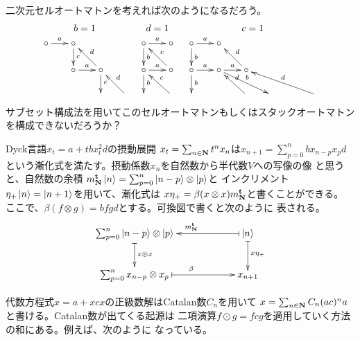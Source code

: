 {\begin{description}
		二次元セルオートマトンを考えれば次のようになるだろう。
		\begin{equation*}\begin{array}{ccc}
			b = 1 & d = 1 & c = 1 \\
			\xymatrix@R=4ex@C=4ex{
				\circ \ar[r]^a & \circ \ar[d]^c \\
				& \circ \ar[r]^a & \circ \ar[d]^c\ar[ul]_d \\
				& & & \ar[ul]_d \\
			} & \xymatrix@R=4ex@C=4ex{
				\circ \ar[d]^b \ar[r]^a & \circ \\
				\circ \ar[r]^a \ar[d]^b & \circ \ar[ul]_c \\
				& \ar[ul]_c \\
			} & \xymatrix@R=4ex@C=4ex{
				\circ \ar[d]^b \ar[r]^a & \circ \\
				\circ \ar[r]^a \ar[d]^b & \circ \ar[r]^a \ar[drr]^b 
					& \circ \ar[ul]_d \\
				& & \ar[ul]_d & & & \ar[ulll]_d \\
			}
		\end{array}\end{equation*}
		サブセット構成法を用いてこのセルオートマトンもしくはスタックオートマトン
		を構成できないだろうか？
		\item[摂動] Dyck言語$x_t=a+tbx_t^2d$の摂動展開
		$x_t=\sum_{n\in\mathbf{N}}t^nx_n$は$x_{n+1}=\sum_{p=0}^nbx_{n-p}x_pd$
		という漸化式を満たす。摂動係数$x_n$を自然数から半代数$V$への写像の像
		と思うと、自然数の余積
		$m_{\mathbf{N}}^{\mathbf{t}}\mathinner{|{n}\rangle}=\sum_{p=0}^n\mathinner{|{n-p}\rangle}\otimes\mathinner{|{p}\rangle}$と
		インクリメント$\eta_+\mathinner{|{n}\rangle}=\mathinner{|{n+1}\rangle}$を用いて、漸化式は
		$x\eta_+=\beta(x\otimes x)m_{\mathbf{N}}^{\mathbf{t}}$と書くことができる。
		ここで、$\beta(f\otimes g)=bfgd$とする。可換図で書くと次のように
		表される。
		\begin{equation*}\xymatrix@C=6em{
			\sum_{p=0}^n \ket{n-p}\otimes\ket{p} \ar@{|->}[d]^{x\otimes x}
				& \ket{n} \ar@{|->}[l]_{m_\sizen^\tran} \ar@{|->}[d]^{x\eta_+} \\
			\sum_{p=0}^n x_{n-p}\otimes x_{p} \ar@{|->}[r]^\beta & x_{n+1} \\
		}\end{equation*}
		\item[優先順位] 代数方程式$x=a+xcx$の正級数解はCatalan数$C_n$を用いて
		$x=\sum_{n\in\mathbf{N}}C_n(ac)^na$と書ける。Catalan数が出てくる起源は
		二項演算$f\odot g=fcg$を適用していく方法の和にある。例えば、次のように
		なっている。
		\begin{equation*}\begin{split}

\end{split}
\end{equation*}
\end{description}}
